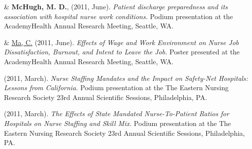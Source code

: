 \documentclass[10pt,]{article}
\begin{document}
{{{{{{{{{{{{{{{\begin{hangparas}{.25in}{1}
\end{hangparas}

\vspace{4mm}

\begin{hangparas}{.25in}{1}

 \& {\textbf {McHugh, M. D.}}, (2011, June). {\textit {Patient discharge preparedness and its association with hospital nurse work conditions.}} Podium presentation at the AcademyHealth Annual Research Meeting, Seattle, WA.

\end{hangparas}

\vspace{4mm}

\begin{hangparas}{.25in}{1}

 \& {\underline {Ma, C.}} (2011, June). {\textit {Effects of Wage and Work Environment on Nurse Job Dissatisfaction, Burnout, and Intent to Leave the Job.}} Poster presented at the AcademyHealth Annual Research Meeting, Seattle, WA.

\end{hangparas}

\vspace{4mm}

\begin{hangparas}{.25in}{1}

 (2011, March). {\textit {Nurse Staffing Mandates and the Impact on Safety-Net Hospitals: Lessons from California.}} Podium presentation at the The Eastern Nursing Research Society 23rd Annual Scientific Sessions, Philadelphia, PA.

\end{hangparas}

\vspace{4mm}

\begin{hangparas}{.25in}{1}

 (2011, March). {\textit {The Effects of State Mandated Nurse-To-Patient Ratios for Hospitals on Nurse Staffing and Skill Mix.}} Podium presentation at the The Eastern Nursing Research Society 23rd Annual Scientific Sessions, Philadelphia, PA.

\end{hangparas}

\vspace{4mm}

\begin{hangparas}{.25in}{1}


\end{hangparas}}}}}}}}}}}}}}}}
\end{document}
